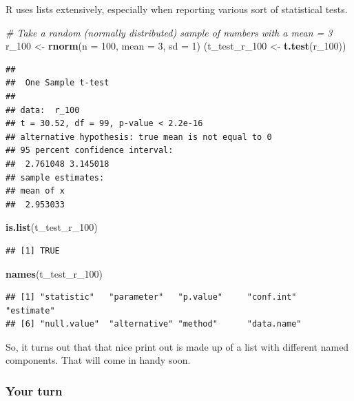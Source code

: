 \documentclass[]{article}
\newenvironment{Shaded}{\begin{snugshade}}{\end{snugshade}}
\newcommand{\KeywordTok}[1]{\textcolor[rgb]{0.13,0.29,0.53}{\textbf{#1}}}
\newcommand{\DataTypeTok}[1]{\textcolor[rgb]{0.13,0.29,0.53}{#1}}
\newcommand{\DecValTok}[1]{\textcolor[rgb]{0.00,0.00,0.81}{#1}}
\newcommand{\StringTok}[1]{\textcolor[rgb]{0.31,0.60,0.02}{#1}}
\newcommand{\CommentTok}[1]{\textcolor[rgb]{0.56,0.35,0.01}{\textit{#1}}}
\newcommand{\NormalTok}[1]{#1}
\begin{document}
R uses lists extensively, especially when reporting various sort of
statistical tests.

\begin{Shaded}
\begin{Highlighting}[]
\CommentTok{# Take a random (normally distributed) sample of numbers with a mean = 3}
\NormalTok{r_}\DecValTok{100}\NormalTok{ <-}\StringTok{ }\KeywordTok{rnorm}\NormalTok{(}\DataTypeTok{n =} \DecValTok{100}\NormalTok{, }\DataTypeTok{mean =} \DecValTok{3}\NormalTok{, }\DataTypeTok{sd =} \DecValTok{1}\NormalTok{)}
\NormalTok{(t_test_r_}\DecValTok{100}\NormalTok{ <-}\StringTok{ }\KeywordTok{t.test}\NormalTok{(r_}\DecValTok{100}\NormalTok{))}
\end{Highlighting}
\end{Shaded}

\begin{verbatim}
## 
##  One Sample t-test
## 
## data:  r_100
## t = 30.52, df = 99, p-value < 2.2e-16
## alternative hypothesis: true mean is not equal to 0
## 95 percent confidence interval:
##  2.761048 3.145018
## sample estimates:
## mean of x 
##  2.953033
\end{verbatim}

\begin{Shaded}
\begin{Highlighting}[]
\KeywordTok{is.list}\NormalTok{(t_test_r_}\DecValTok{100}\NormalTok{)}
\end{Highlighting}
\end{Shaded}

\begin{verbatim}
## [1] TRUE
\end{verbatim}

\begin{Shaded}
\begin{Highlighting}[]
\KeywordTok{names}\NormalTok{(t_test_r_}\DecValTok{100}\NormalTok{)}
\end{Highlighting}
\end{Shaded}

\begin{verbatim}
## [1] "statistic"   "parameter"   "p.value"     "conf.int"    "estimate"   
## [6] "null.value"  "alternative" "method"      "data.name"
\end{verbatim}

So, it turns out that that nice print out is made up of a list with
different named components. That will come in handy soon.

\subsubsection{Your turn}\label{your-turn-2}
\end{document}

